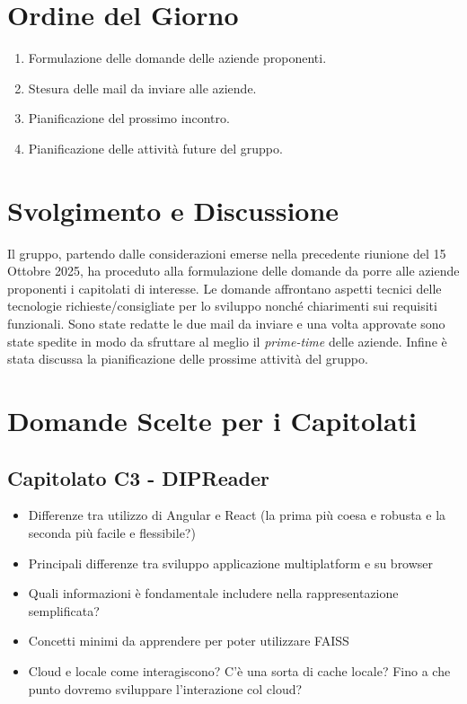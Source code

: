 \documentclass[a4paper,12pt]{article}
\begin{document}
\section{Ordine del Giorno}
\begin{enumerate}
    \item Formulazione delle domande delle aziende proponenti.
    \item Stesura delle mail da inviare alle aziende.
    \item Pianificazione del prossimo incontro.
    \item Pianificazione delle attività future del gruppo.
\end{enumerate}
\vspace{0.5cm}
\section{Svolgimento e Discussione}
Il gruppo, partendo dalle considerazioni emerse nella precedente riunione del 15 Ottobre 2025, ha proceduto alla formulazione delle domande da porre alle aziende proponenti i capitolati di interesse.
Le domande affrontano aspetti tecnici delle tecnologie richieste/consigliate per lo sviluppo nonché chiarimenti sui requisiti funzionali.
Sono state redatte le due mail da inviare e una volta approvate sono state spedite in modo da sfruttare al meglio il \textit{prime-time} delle aziende.
Infine è stata discussa la pianificazione delle prossime attività del gruppo.

\vspace{0.5cm}
\section{Domande Scelte per i Capitolati}

\subsection{Capitolato C3 - DIPReader}
\begin{itemize}
    \item Differenze tra utilizzo di Angular e React (la prima più coesa e robusta e la seconda più facile e flessibile?)
    \item Principali differenze tra sviluppo applicazione multiplatform e su browser
    \item Quali informazioni è fondamentale includere nella rappresentazione semplificata?
    \item Concetti minimi da apprendere per poter utilizzare FAISS
    \item Cloud e locale come interagiscono? C'è una sorta di cache locale? Fino a che punto dovremo sviluppare l'interazione col cloud?
\end{itemize}
\end{document}
